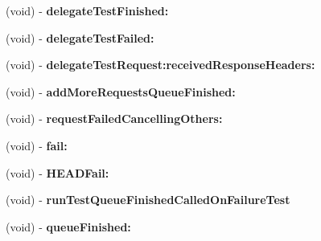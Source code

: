 \begin{DoxyCompactItemize}
\item 
\hypertarget{interface_a_s_i_network_queue_tests_07_08_aa05a6ec84d2a71b363573187e70a6afa}{
(void) -\/ {\bfseries delegate\-Test\-Finished\-:}}
\label{interface_a_s_i_network_queue_tests_07_08_aa05a6ec84d2a71b363573187e70a6afa}

\item 
\hypertarget{interface_a_s_i_network_queue_tests_07_08_a3b74243c00c86e888ffc9cb271138dcb}{
(void) -\/ {\bfseries delegate\-Test\-Failed\-:}}
\label{interface_a_s_i_network_queue_tests_07_08_a3b74243c00c86e888ffc9cb271138dcb}

\item 
\hypertarget{interface_a_s_i_network_queue_tests_07_08_a46a23624618c0547cbcbb9ca82c798cb}{
(void) -\/ {\bfseries delegate\-Test\-Request\-:received\-Response\-Headers\-:}}
\label{interface_a_s_i_network_queue_tests_07_08_a46a23624618c0547cbcbb9ca82c798cb}

\item 
\hypertarget{interface_a_s_i_network_queue_tests_07_08_abe54bb28f6c58b48f2e136adebe7591c}{
(void) -\/ {\bfseries add\-More\-Requests\-Queue\-Finished\-:}}
\label{interface_a_s_i_network_queue_tests_07_08_abe54bb28f6c58b48f2e136adebe7591c}

\item 
\hypertarget{interface_a_s_i_network_queue_tests_07_08_ac13a2a0cfd430c066079f46e968de949}{
(void) -\/ {\bfseries request\-Failed\-Cancelling\-Others\-:}}
\label{interface_a_s_i_network_queue_tests_07_08_ac13a2a0cfd430c066079f46e968de949}

\item 
\hypertarget{interface_a_s_i_network_queue_tests_07_08_a672f203e09f2d4f39fb2f1824cd85443}{
(void) -\/ {\bfseries fail\-:}}
\label{interface_a_s_i_network_queue_tests_07_08_a672f203e09f2d4f39fb2f1824cd85443}

\item 
\hypertarget{interface_a_s_i_network_queue_tests_07_08_abebd73c6087a317cf7d40a0694fa0554}{
(void) -\/ {\bfseries \-H\-E\-A\-D\-Fail\-:}}
\label{interface_a_s_i_network_queue_tests_07_08_abebd73c6087a317cf7d40a0694fa0554}

\item 
\hypertarget{interface_a_s_i_network_queue_tests_07_08_a863286b45c212a9aff1fd8c9415e8eb8}{
(void) -\/ {\bfseries run\-Test\-Queue\-Finished\-Called\-On\-Failure\-Test}}
\label{interface_a_s_i_network_queue_tests_07_08_a863286b45c212a9aff1fd8c9415e8eb8}

\item 
\hypertarget{interface_a_s_i_network_queue_tests_07_08_a7d969cf7beaae41da4ec7ee5d2f524d4}{
(void) -\/ {\bfseries queue\-Finished\-:}}
\label{interface_a_s_i_network_queue_tests_07_08_a7d969cf7beaae41da4ec7ee5d2f524d4}


\end{DoxyCompactItemize}
